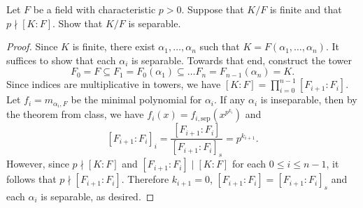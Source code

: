 \documentclass[10pt]{amsart}
\begin{document}
\begin{thm}
  Let $F$ be a field with characteristic $p > 0$.
  Suppose that $K/F$ is finite and that $p \nmid [K : F]$.
  Show that $K/F$ is separable.
  \begin{proof}
    Since $K$ is finite, there exist $\alpha_1, \ldots, \alpha_n$ such that $K = F(\alpha_1, \ldots, \alpha_n)$.
    It suffices to show that each $\alpha_i$ is separable.
    Towards that end, construct the tower 
    $$F_0 = F \subseteq F_1 = F_0(\alpha_1) \subseteq \ldots F_n = F_{n-1}(\alpha_{n}) = K.$$
    Since indices are multiplicative in towers, we have $[K:F] = \prod_{i=0}^{n-1} [F_{i+1} : F_i]$.
    Let $f_i = m_{\alpha_i, F}$ be the minimal polynomial for $\alpha_i$.
    If any $\alpha_i$ is inseparable, then by the theorem from class, we have $f_i(x) = f_{i, \text{sep}}(x^{p^{k_{i}}})$ and
    $$[F_{i+1} : F_i]_i = \frac{[F_{i+1} : F_{i}]}{[F_{i+1} : F_i]_s} = p^{k_{i+1}}.$$
    However, since $p \nmid [K : F]$ and $[F_{i+1} : F_i] \mid [K : F]$ for each $0 \leq i \leq n-1$, it follows that $p \nmid [F_{i+1} : F_i]$.
    Therefore $k_{i+1} = 0$, $[F_{i+1} : F_i] = [F_{i+1} : F_i]_s$ and each $\alpha_i$ is separable, as desired.
  \end{proof}
\end{thm}
\end{document}
